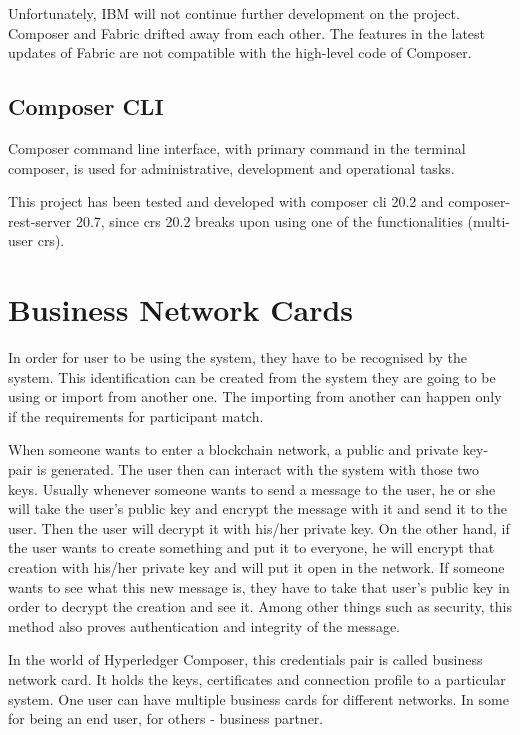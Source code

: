 \documentclass[a4paper,11pt]{report}
\begin{document}
	Unfortunately, IBM will not continue further development on the project. Composer and Fabric drifted away from each other. The features in the latest updates of Fabric are not compatible with the high-level code of Composer.\cite{letter}

\subsection{Composer CLI}

Composer command line interface, with primary command in the terminal composer, is used for administrative, development and operational tasks. 

	This project has been tested and developed with composer cli 20.2 and composer-rest-server 20.7, since crs 20.2 breaks upon using one of the functionalities (multi-user crs). 

\section{Business Network Cards}
\label{bna}

In order for user to be using the system, they have to be recognised by the system. This identification can be created from the system they are going to be using or import from another one. The importing from another can happen only if the requirements for participant match.	

When someone wants to enter a blockchain network, a public and private key-pair is  generated. The user then can interact with the system with those two keys. Usually whenever someone wants to send a message to the user, he or she will take the user’s public key and encrypt the message with it and send it to the user. Then the user will decrypt it with his/her private key. On the other hand, if the user wants to create something and put it to everyone, he will encrypt that creation with his/her private key and will put it open in the network. If someone wants to see what this new message is, they have to take that user’s public key in order to decrypt the creation and see it. Among other things such as security, this method also proves authentication and integrity of the message. 

In the world of Hyperledger Composer, this credentials pair is called business network card. It holds the keys, certificates and connection profile to a particular system. One user can have multiple business cards for different networks. In some for being an end user, for others - business partner. 
\end{document}
